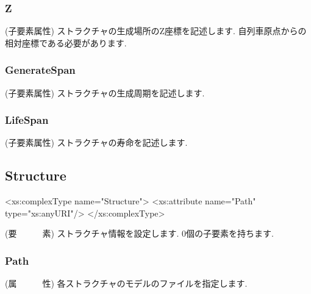 \documentclass[paper={550pt,1200pt},lualatex , ja=standard]{bxjsreport}
\begin{document}
\subsubsection*{Z}
(子要素属性) ストラクチャの生成場所のZ座標を記述します. 自列車原点からの相対座標である必要があります.
\subsubsection*{GenerateSpan}
(子要素属性) ストラクチャの生成周期を記述します.
\subsubsection*{LifeSpan}
(子要素属性) ストラクチャの寿命を記述します.

\subsection*{Structure}
\begin{refxsdlisting}[title=XSD定義,]
<xs:complexType name="Structure">
    <xs:attribute name="Path" type="xs:anyURI"/>
</xs:complexType>
\end{refxsdlisting}
(要　　　素) ストラクチャ情報を設定します. 0個の子要素を持ちます.
\subsubsection*{Path}
(属　　　性) 各ストラクチャのモデルのファイルを指定します.
\end{document}
